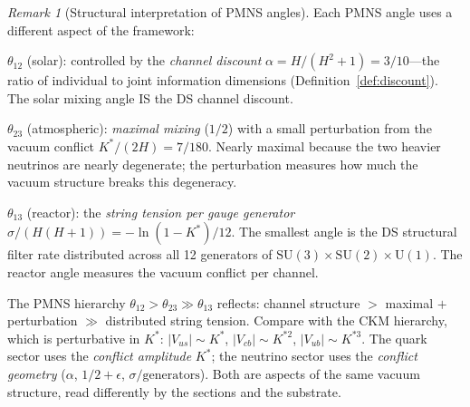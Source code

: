 \documentclass[11pt,a4paper]{article}
\theoremstyle{definition}
\theoremstyle{remark}
\newtheorem{remark}[theorem]{Remark}
\newcommand{\SU}{\mathrm{SU}}
\begin{document}
\begin{remark}[Structural interpretation of PMNS angles]\label{rem:pmns_structure}
Each PMNS angle uses a different aspect of the framework:

$\theta_{12}$ (solar): controlled by the \emph{channel discount} $\alpha=H/(H^2+1)=3/10$---the ratio of individual to joint information dimensions (Definition~\ref{def:discount}). The solar mixing angle IS the DS channel discount.

$\theta_{23}$ (atmospheric): \emph{maximal mixing} ($1/2$) with a small perturbation from the vacuum conflict $K^*/(2H)=7/180$. Nearly maximal because the two heavier neutrinos are nearly degenerate; the perturbation measures how much the vacuum structure breaks this degeneracy.

$\theta_{13}$ (reactor): the \emph{string tension per gauge generator} $\sigma/(H(H+1))=-\ln(1-K^*)/12$. The smallest angle is the DS structural filter rate distributed across all 12 generators of $\SU(3)\times\SU(2)\times\mathrm{U}(1)$. The reactor angle measures the vacuum conflict per channel.

The PMNS hierarchy $\theta_{12}>\theta_{23}\gg\theta_{13}$ reflects: channel structure $>$ maximal $+$ perturbation $\gg$ distributed string tension. Compare with the CKM hierarchy, which is perturbative in $K^*$: $|V_{us}|\sim K^*$, $|V_{cb}|\sim K^{*2}$, $|V_{ub}|\sim K^{*3}$. The quark sector uses the \emph{conflict amplitude} $K^*$; the neutrino sector uses the \emph{conflict geometry} ($\alpha$, $1/2+\epsilon$, $\sigma/\text{generators}$). Both are aspects of the same vacuum structure, read differently by the sections and the substrate.
\end{remark}
\end{document}
